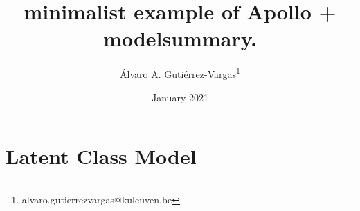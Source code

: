 \documentclass{article}
\title{minimalist example of Apollo + modelsummary.}
\author{\'Alvaro A. Guti\'errez-Vargas\footnote{alvaro.gutierrezvargas@kuleuven.be} }
\date{January 2021}
\date{}
\begin{document}
\maketitle

\section{Latent Class Model}



\end{document}
